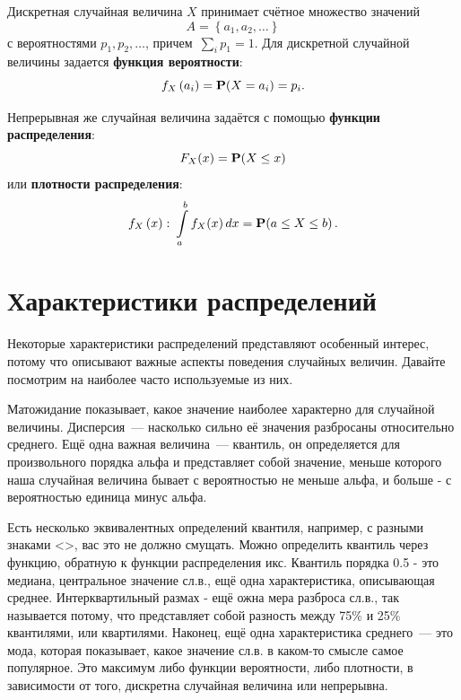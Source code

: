 Дискретная случайная величина $X$ принимает счётное множество значений
\[
    A = \left\{a_1,a_2,\dots \right\}
\]
с вероятностями $p_1,p_2,\dots$, причем~$\sum\limits_{i}p_1=1$. Для дискретной случайной величины задается \textbf{функция вероятности}:
\[
    f_X\left(a_i\right)=\operatorname{\mathbf{P}\!}\left(X=a_i\right)=p_i.
\]

Непрерывная же случайная величина задаётся с помощью \textbf{функции распределения}:
\[
F_X(x) = \operatorname{\mathbf{P}\!}\left(X\leq x\right)
\]
или \textbf{плотности распределения}:
\[
f_X\left(x\right)\colon \int\limits_a^b f_X\!\left(x\right) dx = \operatorname{\mathbf{P}\!}\left(a\leq X \leq b\right).
\]

\section{Характеристики распределений}
Некоторые характеристики распределений представляют особенный интерес, потому что описывают  важные аспекты поведения случайных величин. Давайте посмотрим на наиболее часто используемые из них.

Матожидание показывает, какое значение наиболее характерно для случайной величины. Дисперсия~--- насколько сильно её значения разбросаны относительно среднего. Ещё одна важная величина~--- квантиль, он определяется для произвольного порядка альфа и представляет собой значение, меньше которого наша случайная величина бывает с вероятностью не меньше альфа, и больше - с вероятностью единица минус альфа.

Есть несколько эквивалентных определений квантиля, например, с разными знаками <>, вас это не должно смущать. Можно определить квантиль через функцию, обратную к функции распределения икс. Квантиль порядка 0.5 - это медиана, центральное значение сл.в., ещё одна характеристика, описывающая среднее. Интерквартильный размах - ещё ожна мера разброса сл.в., так называется потому, что представляет собой разность между 75\% и 25\% квантилями, или квартилями. Наконец, ещё одна характеристика среднего~--- это мода, которая показывает, какое значение сл.в. в каком-то смысле самое популярное. Это максимум либо функции вероятности, либо плотности, в зависимости от того, дискретна случайная величина или непрерывна.


